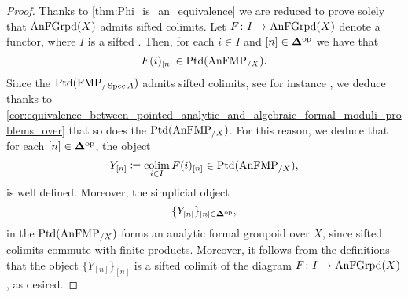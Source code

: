 \documentclass[10pt,a4paper,reqno]{amsart} %
\theoremstyle{plain}
\theoremstyle{definition}
\theoremstyle{remark}
\numberwithin{equation}{section}
\begin{document}
\begin{proof}
    Thanks to \cref{thm:Phi_is_an_equivalence} we are reduced to prove solely that $\mathrm{AnFGrpd}(X)$ admits sifted colimits. Let $F \colon I \to \mathrm{AnFGrpd}(X)$
    denote a functor, where $I$ is a sifted \infcat. Then, for each $i \in I$ and $[n] \in \bm{\Delta} ^\mathrm{op}$ we have that
        \[
            F(i)_{[n]} \in \mathrm{Ptd}(\mathrm{AnFMP}_{/X}).  
        \]
    Since the \infcat $\mathrm{Ptd}(\mathrm{FMP}_{/ \operatorname{Spec} A})$ admits sifted colimits, see for instance \cite[\S 5, Corollary1.6.6]{Gaitsgory_Study_II}, we deduce
    thanks to \cref{cor:equivalence_between_pointed_analytic_and_algebraic_formal_moduli_problems_over} that so does the \infcat $\mathrm{Ptd}(\mathrm{AnFMP}_{/ X})$.
    For this reason, we deduce that for each $[n] \in \bm{\Delta} ^\mathrm{op}$, the object
        \[
            Y_{[n]} \coloneqq \operatorname*{colim}_{i \in I} F(i)_{[n]} \in \mathrm{Ptd}(\mathrm{AnFMP}_{/X}),  
        \]
    is well defined. Moreover, the simplicial object
        \[
            \{ Y_{[n]} \}_{[n] \in \bm{\Delta} ^\mathrm{op}},  
        \]
    in the \infcat $\mathrm{Ptd}(\mathrm{AnFMP}_{/X})$ forms an analytic formal groupoid over $X$, since sifted colimits commute with finite products. Moreover, it follows from the
    definitions that the object $\{Y_{[n]} \}_{[n]}$ is a sifted colimit of the diagram $F \colon I \to \mathrm{AnFGrpd}(X)$, as desired.
\end{proof}
\end{document}
